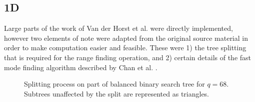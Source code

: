 \documentclass{article}
\begin{document}
\subsection{1D}
Large parts of the work of Van der Horst et al.
\cite{vanderhorst_et_al:LIPIcs.ESA.2022.67} were directly implemented, however
two elements of note were adapted from the original source material in order to
make computation easier and feasible. These were 1) the tree splitting that is
required for the range finding operation, and 2) certain details of the fast
mode finding algorithm described by Chan et al. \cite{Chan2014}.
\begin{figure}%
    \centering
    \qquad
    \caption{Splitting process on part of balanced binary search tree for $q=68$. Subtrees unaffected by the split are represented as triangles.}%
    \label{fig:example}%
\end{figure}
\end{document}
